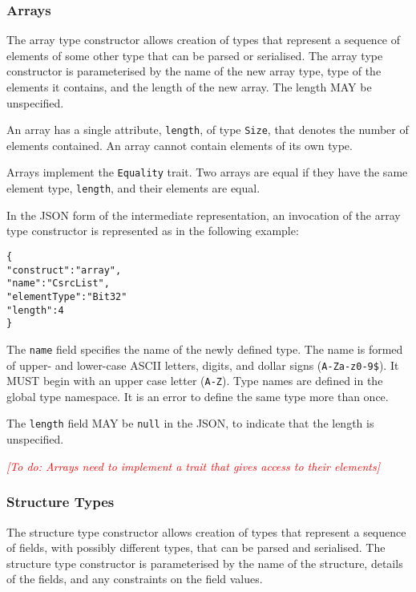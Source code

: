 \documentclass[10pt,twocolumn,a4paper]{article}
\newcommand{\todo}[1]{\textit{\textcolor{red}{[To do: #1]}}}
\newcommand{\code}[1]{\texttt{#1}}
\begin{document}
\subsubsection{Arrays}

The array type constructor allows creation of types that represent a
sequence of elements of some other type that can be parsed or serialised.
The array type constructor is parameterised by the name of the new array
type, type of the elements it contains, and the length of the new array.
The length MAY be unspecified. 

An array has a single attribute, \code{length}, of type \code{Size}, that
denotes the number of elements contained. An array cannot contain elements
of its own type.

Arrays implement the \code{Equality} trait. Two arrays are equal if they
have the same element type, \code{length}, and their elements are equal.

In the JSON form of the intermediate representation, an invocation of the
array type constructor is represented as in the following example:
\footnotesize
\begin{alltt}
  \{
    "construct"   : "array",
    "name"        : "CsrcList",
    "elementType" : "Bit32"
    "length"      : 4
  \}
\end{alltt}
\normalsize
The \code{name} field specifies the name of the newly defined type. The
name is formed of upper- and lower-case ASCII letters, digits, and dollar
signs (\code{A-Za-z0-9\$}).  It MUST begin with an upper case letter
(\code{A-Z}). Type names are defined in the global type namespace.
It is an error to define the same type more than once.

The \code{length} field MAY be \code{null} in the JSON, to indicate that
the length is unspecified.

\todo{Arrays need to implement a trait that gives access to their elements}

\subsubsection{Structure Types}

The structure type constructor allows creation of types that represent a
sequence of fields, with possibly different types, that can be parsed and
serialised. The structure type constructor is parameterised by the name of
the structure, details of the fields, and any constraints on the field
values.
\end{document}
